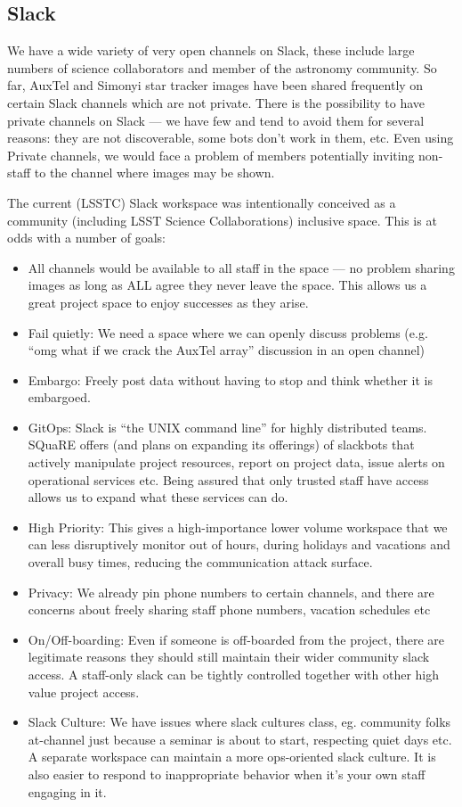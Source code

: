 \subsection{Slack} \label{sec:slack}

We have a wide variety of very open channels on Slack, these include large numbers of science collaborators and member of the astronomy community.
So far, AuxTel and Simonyi star tracker images have been shared frequently on certain Slack channels which are not private.
There is the possibility to have private channels on Slack --- we have few and tend to avoid them for several reasons: they are not discoverable, some bots don't work in them, etc.
Even using Private channels, we would face a problem of members potentially inviting non-staff to the channel where images may be shown.


The current (LSSTC) Slack workspace was intentionally conceived as a community (including LSST Science Collaborations) inclusive space. This is at odds with a number of goals:

\begin{itemize}
\item  All channels would be available to all staff in the space --- no problem sharing images as long as ALL agree they never leave the space.
This allows us a great project space to enjoy successes as they arise.
\item  Fail quietly: We need a space where we can openly discuss problems (e.g. “omg what if we crack the AuxTel array” discussion in an open channel)
\item Embargo: Freely post data without having to stop and think whether it is embargoed.
\item GitOps: Slack is “the UNIX command line” for highly distributed teams. SQuaRE offers (and plans on expanding its offerings) of slackbots that actively manipulate project resources, report on project data, issue alerts on operational services etc. Being assured that only trusted staff have access allows us to expand what these services can do.
\item High Priority:  This gives a high-importance lower volume workspace that we can less disruptively monitor out of hours, during holidays and vacations and overall busy times, reducing the communication attack surface.
\item Privacy: We already pin phone numbers to certain channels, and there are concerns about freely sharing staff phone numbers, vacation schedules etc
\item On/Off-boarding: Even if someone is off-boarded from the project, there are legitimate reasons they should still maintain their wider community slack access. A staff-only slack can be tightly controlled together with other high value project access.
\item Slack Culture: We have issues where slack cultures class, eg. community folks at-channel just because a seminar is about to start, respecting quiet days etc. A separate workspace can maintain a more ops-oriented slack culture. It is also easier to respond to inappropriate behavior when it’s your own staff engaging in it.
\end{itemize}

